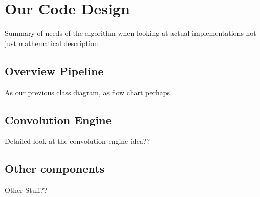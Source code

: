 \section{Our Code Design}
Summary of needs of the algorithm when looking at actual implementations not just mathematical description.
\subsection{Overview Pipeline}
As our previous class diagram, as flow chart perhaps
\subsection{Convolution Engine}
Detailed look at the convolution engine idea??
\subsection{Other components}
Other Stuff??
